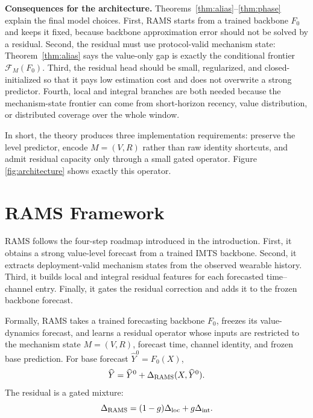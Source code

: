﻿\documentclass[10pt,conference]{IEEEtran}
\newcommand{\method}{\textnormal{\mbox{RAMS}}}
\begin{document}
\textbf{Consequences for the architecture.}
Theorems~\ref{thm:alias}--\ref{thm:phase} explain the final model choices.
First, \method{} starts from a trained backbone \(F_0\) and keeps it fixed,
because backbone approximation error should not be solved by a residual.
Second, the residual must use protocol-valid mechanism state:
Theorem~\ref{thm:alias} says the value-only gap is exactly the conditional
frontier \(\mathcal{F}_M(F_0)\).  Third, the residual head should be small,
regularized, and closed-initialized so that it pays low estimation cost and
does not overwrite a strong predictor.  Fourth, local and integral branches
are both needed because the mechanism-state frontier can come from short-horizon
recency, value distribution, or distributed coverage over the whole window.

In short, the theory produces three implementation requirements: preserve the
level predictor, encode \(M=(V,R)\) rather than raw identity shortcuts, and
admit residual capacity only through a small gated operator.  Figure
\ref{fig:architecture} shows exactly this operator.

\section{\method{} Framework}
\label{sec:method}

\method{} follows the four-step roadmap introduced in the introduction.  First,
it obtains a strong value-level forecast from a trained IMTS backbone.  Second,
it extracts deployment-valid mechanism states from the observed wearable
history.  Third, it builds local and integral residual features for each
forecasted time--channel entry.  Finally, it gates the residual correction and
adds it to the frozen backbone forecast.

Formally, \method{} takes a trained forecasting backbone \(F_0\), freezes its
value-dynamics forecast, and learns a residual operator whose inputs are
restricted to the mechanism state \(M=(V,R)\), forecast time, channel identity,
and frozen base prediction.  For base forecast \(\widehat{Y}^{0}=F_0(X)\),
\begin{equation}
\widehat{Y}
=\widehat{Y}^{0}
+\Delta_{\rm RAMS}(X,\widehat{Y}^{0}).
\label{eq:main-model}
\end{equation}
The residual is a gated mixture:
\begin{equation}
\Delta_{\rm RAMS}
=(1-g)\Delta_{\rm loc}+g\Delta_{\rm int}.
\label{eq:branchmix}
\end{equation}
\end{document}
